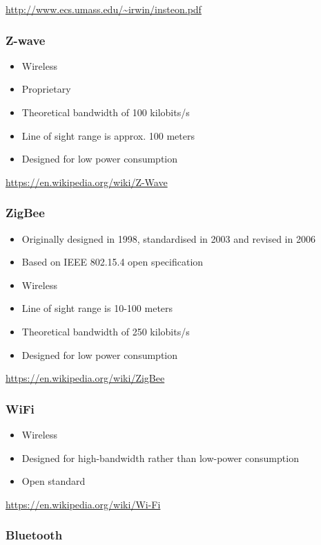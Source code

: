 \url{http://www.ecs.umass.edu/~irwin/insteon.pdf}

\subsubsection{Z-wave}

\begin{itemize}
\item Wireless
\item Proprietary
\item Theoretical bandwidth of 100 kilobits/s
\item Line of sight range is approx. 100 meters
\item Designed for low power consumption
\end{itemize}

\url{https://en.wikipedia.org/wiki/Z-Wave}

\subsubsection{ZigBee}

\begin{itemize}
\item Originally designed in 1998, standardised in 2003 and revised in 2006
\item Based on IEEE 802.15.4 open specification
\item Wireless
\item Line of sight range is 10-100 meters
\item Theoretical bandwidth of 250 kilobits/s
\item Designed for low power consumption
\end{itemize}

\url{https://en.wikipedia.org/wiki/ZigBee}

\subsubsection{WiFi}

\begin{itemize}
\item Wireless
\item Designed for high-bandwidth rather than low-power consumption
\item Open standard
\end{itemize}

\url{https://en.wikipedia.org/wiki/Wi-Fi}

\subsubsection{Bluetooth}

